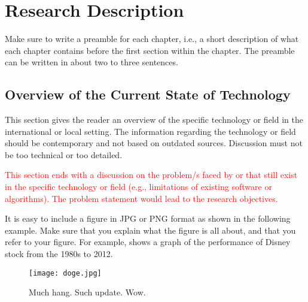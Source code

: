 %
%
%                 

\chapter{Research Description}
\label{sec:researchdesc}    %

Make sure to write a preamble for each chapter, i.e., a short description of what each chapter contains before 
the first section within the chapter.  The preamble can be written in about two to three sentences.

\section{Overview of the Current State of Technology}
\label{sec:overview}

%
%

This section gives the reader an overview of the specific technology or field in the international or
local setting. The information regarding the technology or field should be contemporary and not
based on outdated sources. Discussion must not be too technical or too detailed.
   
\textcolor{red}{This section ends with a discussion on the problem/s faced by or that still exist in the specific
technology or field (e.g., limitations of existing software or algorithms). The problem statement
would lead to the research objectives.}


It is   easy to include a figure in JPG or PNG format as shown in the 
following example.  Make sure that you explain what the figure is all about,
and that you refer to your figure.  For example,  shows a graph of the performance of Disney stock from the 1980s to 2012.
  
\begin{figure}[t]                %
   \centering                    %
   \texttt{[image: doge.jpg]}     %
   \caption{Much hang. Such update. Wow.}
    \label{fig:disneystock}
\end{figure}

